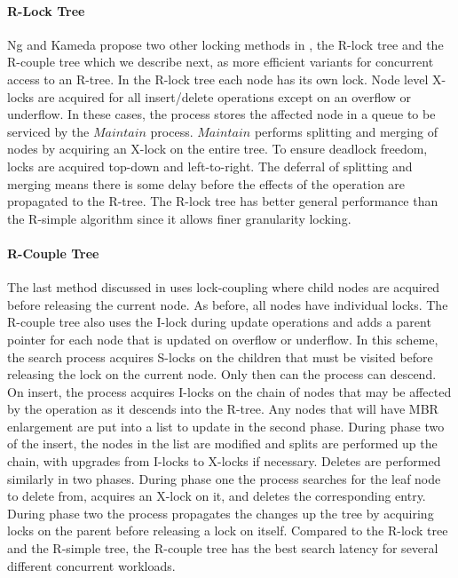 \paragraph{R-Lock Tree} Ng and Kameda propose two other locking methods in 
\cite{ng1993concurrent}, the R-lock tree and the R-couple tree which we describe 
next, as more efficient variants for concurrent access to an R-tree. In the R-lock 
tree each node has its own lock. Node level X-locks are acquired for all 
insert/delete operations except on an overflow or underflow. In these cases, the 
process stores the affected node in a queue to be serviced by the $Maintain$ process.
$Maintain$ performs splitting and merging of nodes by acquiring an X-lock on the 
entire tree. To ensure deadlock freedom, locks are acquired top-down and 
left-to-right. The deferral of splitting and merging means there is some delay
before the effects of the operation are propagated to the R-tree. The R-lock tree
has better general performance than the R-simple algorithm since it allows finer 
granularity locking.

\paragraph{R-Couple Tree} The last method discussed in \cite{ng1993concurrent}
uses lock-coupling where child nodes are acquired before releasing the current
node. As before, all nodes have individual locks. The R-couple tree also uses 
the I-lock during update operations and adds a parent pointer for
each node that is updated on overflow or underflow. In this scheme, the search 
process acquires S-locks on the children that must be visited before releasing 
the lock on the current node. Only then can the process can descend. On insert, 
the process acquires I-locks on the chain of nodes that may be affected by the 
operation as it descends into the R-tree. Any nodes that will have MBR 
enlargement are put into a list to update in the second phase. During phase two 
of the insert, the nodes in the list are modified and splits are performed up
the chain, with upgrades from I-locks to X-locks if necessary. Deletes are 
performed similarly in two phases. During phase one the process searches for the 
leaf node to delete from, acquires an X-lock on it, and deletes the corresponding
entry. During phase two the process propagates the changes up the tree by 
acquiring locks on the parent before releasing a lock on itself. Compared to the 
R-lock tree and the R-simple tree, the R-couple tree has the best search latency 
for several different concurrent workloads. 

